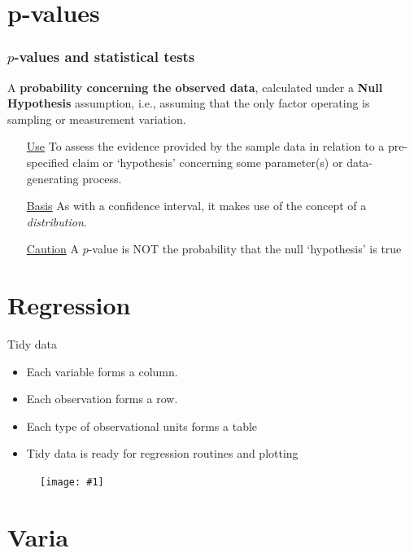 \documentclass{beamer}\usepackage[]{graphicx}\usepackage[]{color}
\newcommand {\framedgraphic}[1] {
	\begin{figure}
		\centering
		\texttt{[image: \#1]}
	\end{figure}
}
\begin{document}
\section{p-values}

\begin{frame}
\frametitle{$p$-values and statistical tests}


\begin{defm}[$p$-value]
	A \textbf{probability concerning the observed data}, calculated under a \textbf{Null Hypothesis} assumption, i.e., assuming that the only factor operating is sampling or measurement variation. 
\end{defm}

\begin{itemize} 
	\item[\underline{Use}] To assess the evidence provided by the sample data
	in relation to a pre-specified claim or `hypothesis' concerning some parameter(s) or data-generating process. 
	\item[\underline{Basis}] As with a confidence interval, it makes use of the concept of a \textit{distribution}. 
	\item[\underline{Caution}] A $p$-value is NOT the probability that the null `hypothesis' is true
\end{itemize}
\end{frame}




\section{Regression}

\begin{frame}{Tidy data}

\begin{itemize}
	\setlength\itemsep{.51em}
	\item Each variable forms a column.
	\item Each observation forms a row.
	\item Each type of observational units forms a table
	\item Tidy data is ready for regression routines and plotting
\end{itemize}


\framedgraphic{tidy.png}

\end{frame}



\section{Varia}
\end{document}
